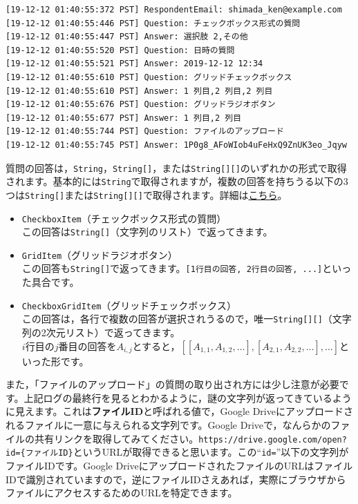 \documentclass[uplatex,a4j]{jsarticle}
\begin{document}
\begin{lstlisting}[basicstyle=\ttfamily\footnotesize,frame=single,caption=Event Object sample 6]
[19-12-12 01:40:55:372 PST] RespondentEmail: shimada_ken@example.com
[19-12-12 01:40:55:446 PST] Question: チェックボックス形式の質問
[19-12-12 01:40:55:447 PST] Answer: 選択肢 2,その他
[19-12-12 01:40:55:520 PST] Question: 日時の質問
[19-12-12 01:40:55:521 PST] Answer: 2019-12-12 12:34
[19-12-12 01:40:55:610 PST] Question: グリッドチェックボックス
[19-12-12 01:40:55:610 PST] Answer: 1 列目,2 列目,2 列目
[19-12-12 01:40:55:676 PST] Question: グリッドラジオボタン
[19-12-12 01:40:55:677 PST] Answer: 1 列目,2 列目
[19-12-12 01:40:55:744 PST] Question: ファイルのアップロード
[19-12-12 01:40:55:745 PST] Answer: 1P0g8_AFoWIob4uFeHxQ9ZnUK3eo_Jqyw
\end{lstlisting}


質問の回答は，\verb|String|，\verb|String[]|，または\verb|String[][]|のいずれかの形式で取得されます。基本的には\verb|String|で取得されますが，複数の回答を持ちうる以下の3つは\verb|String[]|または\verb|String[][]|で取得されます。詳細は\href{https://developers.google.com/apps-script/reference/forms/item-response.html?hl=en#getResponse()}{こちら}。
\begin{itemize}
\item \verb|CheckboxItem|（チェックボックス形式の質問）\\
この回答は\verb|String[]|（文字列のリスト）で返ってきます。
\item \verb|GridItem|（グリッドラジオボタン）\\
この回答も\verb|String[]|で返ってきます。\verb|[1行目の回答, 2行目の回答, ...]|といった具合です。
\item \verb|CheckboxGridItem|（グリッドチェックボックス）\\
この回答は，各行で複数の回答が選択されうるので，唯一\verb|String[][]|（文字列の2次元リスト）で返ってきます。\\
$i$行目の$j$番目の回答を$A_{i, j}$とすると，$\left[\left[A_{1, 1}, A_{1, 2}, \dots\right], \left[A_{2, 1}, A_{2,2}, \dots\right], \dots\right]$といった形です。
\end{itemize}

また，「ファイルのアップロード」の質問の取り出され方には少し注意が必要です。上記ログの最終行を見るとわかるように，謎の文字列が返ってきているように見えます。これは\textbf{ファイルID}と呼ばれる値で，Google Driveにアップロードされるファイルに一意に与えられる文字列です。Google Driveで，なんらかのファイルの共有リンクを取得してみてください。\verb|https://drive.google.com/open?id={ファイルID}|というURLが取得できると思います。この``\verb|id=|''以下の文字列がファイルIDです。Google DriveにアップロードされたファイルのURLはファイルIDで識別されていますので，逆にファイルIDさえあれば，実際にブラウザからファイルにアクセスするためのURLを特定できます。
\end{document}

